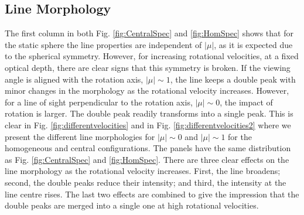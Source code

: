 \subsection{Line Morphology}
\label{sec:angles}
The first column in both Fig. \ref{fig:CentralSpec} and
\ref{fig:HomSpec} shows that for the static sphere the line properties
are independent of $|\mu|$, as it is expected due
to the spherical symmetry.
However, for increasing rotational velocities, at a fixed optical
depth, there are clear signs that this symmetry is broken.
If the viewing angle is aligned with the rotation axis, $|\mu|\sim
1$, the \ly line keeps a double peak with minor
changes in the morphology as the rotational velocity increases.
However, for a line of sight perpendicular to the rotation axis,
$|\mu|\sim 0$, the impact of rotation is larger.
The double peak readily transforms into a single peak.
This is clear in Fig. \ref{fig:differentvelocities} and in Fig.
\ref{fig:differentvelocities2} where we
present the different line morphologies for $|\mu|\sim 0$ and
$|\mu|\sim 1 $ for the
homogeneous and central configurations.
The panels have the same distribution as Fig. \ref{fig:CentralSpec}
and \ref{fig:HomSpec}.
There are three clear effects on the line morphology as the rotational
velocity increases.
First, the line broadens; second, the double peaks reduce their intensity; and
third, the intensity at the line centre rises.
The last two effects are combined to give the impression that the double
peaks are merged into a single one at high rotational velocities.
